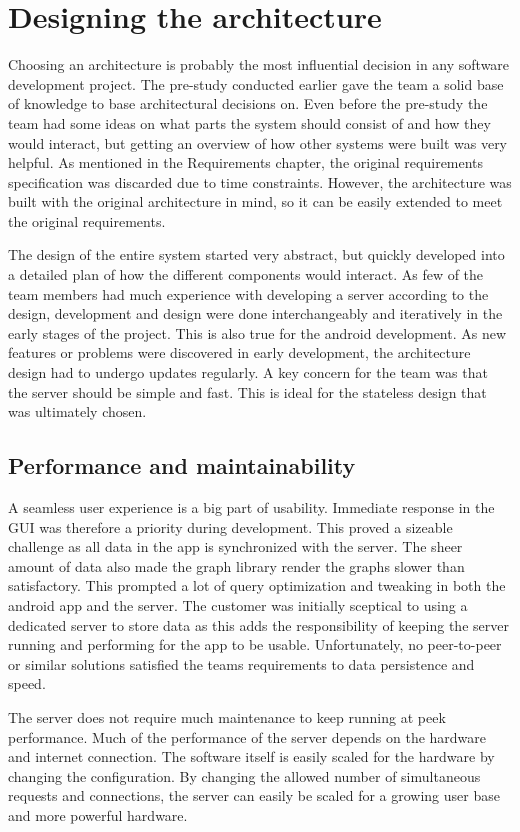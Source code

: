 \section{Designing the architecture}
Choosing an architecture is probably the most influential decision in any software development project. The pre-study conducted earlier gave the team a solid base of knowledge to base architectural 
decisions on. Even before the pre-study the team had some ideas on what parts the system should consist of and how they would interact, but getting an overview of how other systems were built was 
very helpful. As mentioned in the Requirements chapter, the original requirements specification was discarded due to time constraints. However, the architecture was built with the original architecture in mind, so it can be easily extended to meet the original requirements.

The design of the entire system started very abstract, but quickly developed into a detailed plan of how the different components would interact. As few of the team members had much 
experience with developing a server according to the design, development and design were done interchangeably and iteratively in the early stages of the project. This is also true for the 
android development. As new features or problems were discovered in early development, the architecture design had to undergo updates regularly. A key concern for the team was that the 
server should be simple and fast. This is ideal for the stateless design that was ultimately chosen. 

\subsection{Performance and maintainability}
A seamless user experience is a big part of usability. Immediate response in the GUI was therefore a priority during development. This proved a sizeable challenge as all data in the 
app is synchronized with the server. The sheer amount of data also made the graph library render the graphs slower than satisfactory. This prompted a lot of query optimization and tweaking 
in both the android app and the server. The customer was initially sceptical to using a dedicated server to store data as this adds the responsibility of keeping the server running and performing 
for the app to be usable. Unfortunately, no peer-to-peer or similar solutions satisfied the teams requirements to data persistence and speed.

The server does not require much maintenance to keep running at peek performance. Much of the performance of the server depends on the hardware and internet connection. 
The software itself is easily scaled for the hardware by changing the configuration. By changing the allowed number of simultaneous requests and connections, the server can easily be 
scaled for a growing user base and more powerful hardware.

